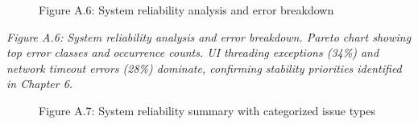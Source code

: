 \documentclass[12pt,a4paper]{article}
\begin{document}
\begin{figure}
\centering
{}
\caption{Figure A.6: System reliability analysis and error breakdown}
\end{figure}

\emph{Figure A.6: System reliability analysis and error breakdown. Pareto chart showing top error classes and occurrence counts. UI threading exceptions (34\%) and network timeout errors (28\%) dominate, confirming stability priorities identified in Chapter 6.}

\begin{figure}
\centering
{}
\caption{Figure A.7: System reliability summary with categorized issue types}
\end{figure}
\end{document}
